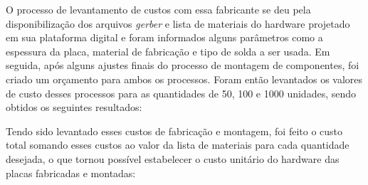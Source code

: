 O processo de levantamento de custos com essa fabricante se deu pela disponibilização dos arquivos \textit{gerber} e lista de materiais do hardware projetado em sua plataforma digital e foram informados alguns parâmetros como a espessura da placa, material de fabricação e tipo de solda a ser usada. Em seguida, após alguns ajustes finais do processo de montagem de componentes, foi criado um orçamento para ambos os processos. Foram então levantados os valores de custo desses processos para as quantidades de 50, 100 e 1000 unidades, sendo obtidos os seguintes resultados:

	\begin{table}[!h]
	\captionsetup{width=7cm}%
    \end{table}
Tendo sido levantado esses custos de fabricação e montagem, foi feito o custo total somando esses custos ao valor da lista de materiais para cada quantidade desejada, o que tornou possível estabelecer o custo unitário do hardware das placas fabricadas e montadas:


	\begin{table}[!h]
	\captionsetup{width=7cm}%
    \end{table}


